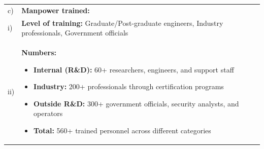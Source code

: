 \documentclass[12pt,a4paper]{article}
\begin{document}
\begin{longtable}{|p{0.5cm}p{3cm}|p{11cm}|}
\multicolumn{2}{|l|}{c)} & \textbf{Manpower trained:} \\
\multicolumn{2}{|l|}{i)} & \textbf{Level of training:} Graduate/Post-graduate engineers, Industry professionals, Government officials \\
\multicolumn{2}{|l|}{ii)} & \textbf{Numbers:} 
\begin{itemize}[leftmargin=1em, itemsep=0pt]
    \item \textbf{Internal (R\&D):} 60+ researchers, engineers, and support staff
    \item \textbf{Industry:} 200+ professionals through certification programs
    \item \textbf{Outside R\&D:} 300+ government officials, security analysts, and operators
    \item \textbf{Total:} 560+ trained personnel across different categories
\end{itemize} \\
\hline

\end{longtable}

\newpage
\end{document}
